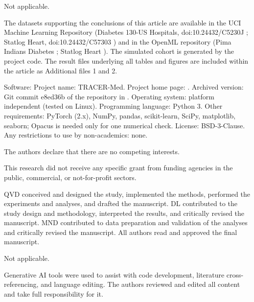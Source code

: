 \documentclass[pdflatex,sn-vancouver-num,referee,lineno]{sn-jnl}
\theoremstyle{thmstyleone}
\theoremstyle{thmstylethree}
\begin{document}
Not applicable.

The datasets supporting the conclusions of this article are available in the UCI Machine Learning Repository (Diabetes 130-US Hospitals, doi:10.24432/C5230J \cite{uci_diabetes130}; Statlog Heart, doi:10.24432/C57303 \cite{uci_statlog_heart}) and in the OpenML repository (Pima Indians Diabetes \cite{openml_pima}; Statlog Heart \cite{openml_heart}). The simulated cohort is generated by the project code. The result files underlying all tables and figures are included within the article as Additional files 1 and 2.

Software: Project name: TRACER-Med. Project home page: \cite{tracermed_code}. Archived version: Git commit e8ed36b of the repository in \cite{tracermed_code}. Operating system: platform independent (tested on Linux). Programming language: Python 3. Other requirements: PyTorch (2.x), NumPy, pandas, scikit-learn, SciPy, matplotlib, seaborn; Opacus is needed only for one numerical check. License: BSD-3-Clause. Any restrictions to use by non-academics: none.

The authors declare that there are no competing interests.

This research did not receive any specific grant from funding agencies in the public, commercial, or not-for-profit sectors.

QVD conceived and designed the study, implemented the methods, performed the experiments and analyses, and drafted the manuscript. DL contributed to the study design and methodology, interpreted the results, and critically revised the manuscript. MND contributed to data preparation and validation of the analyses and critically revised the manuscript. All authors read and approved the final manuscript.

Not applicable.

Generative AI tools were used to assist with code development, literature cross-referencing, and language editing. The authors reviewed and edited all content and take full responsibility for it.


\end{document}
